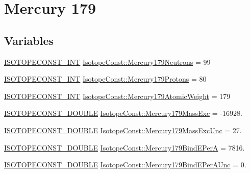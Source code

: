 \hypertarget{group___isotope_const-_mercury-_hg179}{}\section{Mercury 179}
\label{group___isotope_const-_mercury-_hg179}
\subsection*{Variables}
\begin{DoxyCompactItemize}
\item 
\mbox{\hyperlink{group___isotope_const-_macros_ga5f18360b3e99483a35c32d789e62621c}{I\+S\+O\+T\+O\+P\+E\+C\+O\+N\+S\+T\+\_\+\+I\+NT}} \mbox{\hyperlink{group___isotope_const-_mercury-_hg179_ga9f6f4753f11f158e0c1d64b98c020d7a}{Isotope\+Const\+::\+Mercury179\+Neutrons}} = 99
\item 
\mbox{\hyperlink{group___isotope_const-_macros_ga5f18360b3e99483a35c32d789e62621c}{I\+S\+O\+T\+O\+P\+E\+C\+O\+N\+S\+T\+\_\+\+I\+NT}} \mbox{\hyperlink{group___isotope_const-_mercury-_hg179_ga8b77c8f6f02e57c6f352f463525329f9}{Isotope\+Const\+::\+Mercury179\+Protons}} = 80
\item 
\mbox{\hyperlink{group___isotope_const-_macros_ga5f18360b3e99483a35c32d789e62621c}{I\+S\+O\+T\+O\+P\+E\+C\+O\+N\+S\+T\+\_\+\+I\+NT}} \mbox{\hyperlink{group___isotope_const-_mercury-_hg179_gab796b120fb6c0ec470139bef9c88fd35}{Isotope\+Const\+::\+Mercury179\+Atomic\+Weight}} = 179
\item 
\mbox{\hyperlink{group___isotope_const-_macros_ga8f45a7272ce02c0b4c65c44636ed719a}{I\+S\+O\+T\+O\+P\+E\+C\+O\+N\+S\+T\+\_\+\+D\+O\+U\+B\+LE}} \mbox{\hyperlink{group___isotope_const-_mercury-_hg179_ga63e5b6292795ff34a0148f876f560689}{Isotope\+Const\+::\+Mercury179\+Mass\+Exc}} = -\/16928.
\item 
\mbox{\hyperlink{group___isotope_const-_macros_ga8f45a7272ce02c0b4c65c44636ed719a}{I\+S\+O\+T\+O\+P\+E\+C\+O\+N\+S\+T\+\_\+\+D\+O\+U\+B\+LE}} \mbox{\hyperlink{group___isotope_const-_mercury-_hg179_ga8c60eeac575ecc215530642064e967de}{Isotope\+Const\+::\+Mercury179\+Mass\+Exc\+Unc}} = 27.
\item 
\mbox{\hyperlink{group___isotope_const-_macros_ga8f45a7272ce02c0b4c65c44636ed719a}{I\+S\+O\+T\+O\+P\+E\+C\+O\+N\+S\+T\+\_\+\+D\+O\+U\+B\+LE}} \mbox{\hyperlink{group___isotope_const-_mercury-_hg179_gafe36402445d635abc73515cff3af8789}{Isotope\+Const\+::\+Mercury179\+Bind\+E\+PerA}} = 7816.
\item 
\mbox{\hyperlink{group___isotope_const-_macros_ga8f45a7272ce02c0b4c65c44636ed719a}{I\+S\+O\+T\+O\+P\+E\+C\+O\+N\+S\+T\+\_\+\+D\+O\+U\+B\+LE}} \mbox{\hyperlink{group___isotope_const-_mercury-_hg179_ga161bdc310fe2733802d6e5f12b2bcc2f}{Isotope\+Const\+::\+Mercury179\+Bind\+E\+Per\+A\+Unc}} = 0.

\end{DoxyCompactItemize}
